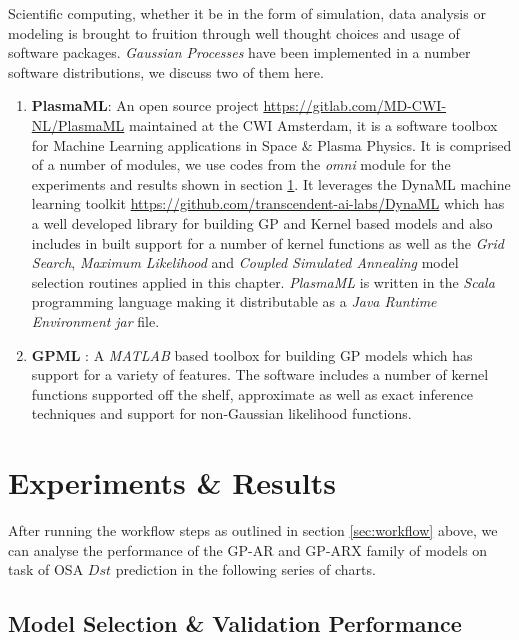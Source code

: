 \documentclass{article}
\begin{document}
Scientific computing, whether it be in the form of simulation, data analysis or modeling is brought to fruition through well thought choices and usage of software packages. \emph{Gaussian Processes} have been implemented in a number software distributions, we discuss two of them here.

\begin{enumerate}

\item \textbf{PlasmaML}: An open source project \url{https://gitlab.com/MD-CWI-NL/PlasmaML} maintained at the CWI Amsterdam, it is a software toolbox for Machine Learning applications in Space \& Plasma Physics. It is comprised of a number of modules, we use codes from the \textit{omni} module for the experiments and results shown in section \ref{sec:results}. It leverages the DynaML machine learning toolkit \url{https://github.com/transcendent-ai-labs/DynaML} which has a well developed library for building GP and Kernel based models and also includes in built support for a number of kernel functions as well as the \emph{Grid Search}, \emph{Maximum Likelihood} and \emph{Coupled Simulated Annealing} model selection routines applied in this chapter. \textit{PlasmaML} is written in the \textit{Scala} programming language making it distributable as a \emph{Java Runtime Environment} \textit{jar} file.

\item \textbf{GPML} \citep{GPML}: A \emph{MATLAB} based toolbox for building GP models which has support for a variety of features. The software includes a number of kernel functions supported off the shelf, approximate as well as exact inference techniques and support for non-Gaussian likelihood functions. 
\end{enumerate}

\section{Experiments \& Results}\label{sec:results}

After running the workflow steps as outlined in section \ref{sec:workflow} above, we can analyse the performance of the GP-AR and GP-ARX family of models on task of OSA $Dst$ prediction in the following series of charts.

\subsection*{Model Selection \& Validation Performance}
\end{document}
